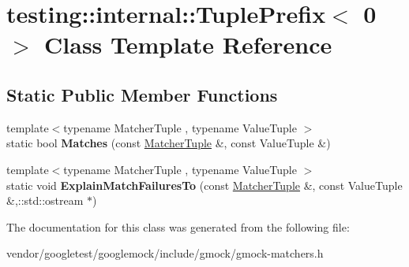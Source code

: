 \hypertarget{classtesting_1_1internal_1_1TuplePrefix_3_010_01_4}{}\section{testing\+:\+:internal\+:\+:Tuple\+Prefix$<$ 0 $>$ Class Template Reference}
\label{classtesting_1_1internal_1_1TuplePrefix_3_010_01_4}
\subsection*{Static Public Member Functions}
\begin{DoxyCompactItemize}
\item 
{\footnotesize template$<$typename Matcher\+Tuple , typename Value\+Tuple $>$ }\\static bool {\bfseries Matches} (const \hyperlink{structtesting_1_1internal_1_1MatcherTuple}{Matcher\+Tuple} \&, const Value\+Tuple \&)\hypertarget{classtesting_1_1internal_1_1TuplePrefix_3_010_01_4_a8bb323da9f209f4fef5d81d7c0b628e9}{}\label{classtesting_1_1internal_1_1TuplePrefix_3_010_01_4_a8bb323da9f209f4fef5d81d7c0b628e9}

\item 
{\footnotesize template$<$typename Matcher\+Tuple , typename Value\+Tuple $>$ }\\static void {\bfseries Explain\+Match\+Failures\+To} (const \hyperlink{structtesting_1_1internal_1_1MatcherTuple}{Matcher\+Tuple} \&, const Value\+Tuple \&,\+::std\+::ostream $\ast$)\hypertarget{classtesting_1_1internal_1_1TuplePrefix_3_010_01_4_a8c86e2f864d1210f10f0faf980bc2758}{}\label{classtesting_1_1internal_1_1TuplePrefix_3_010_01_4_a8c86e2f864d1210f10f0faf980bc2758}

\end{DoxyCompactItemize}


The documentation for this class was generated from the following file\+:\begin{DoxyCompactItemize}
\item 
vendor/googletest/googlemock/include/gmock/gmock-\/matchers.\+h\end{DoxyCompactItemize}
